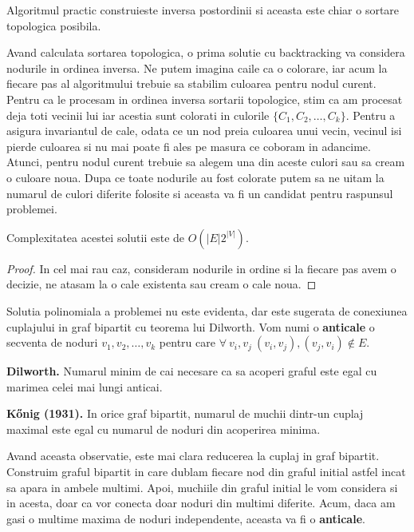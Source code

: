 Algoritmul practic construieste inversa postordinii si aceasta este chiar o sortare topologica posibila.

Avand calculata sortarea topologica, o prima solutie cu backtracking va considera nodurile in ordinea inversa.
Ne putem imagina caile ca o colorare, iar acum la fiecare pas al algoritmului trebuie sa stabilim culoarea pentru
nodul curent. Pentru ca le procesam in ordinea inversa sortarii topologice, stim ca am procesat deja toti vecinii lui
iar acestia sunt colorati in culorile $\{C_{1}, C_{2}, \ldots, C_{k}\}$. Pentru a asigura invariantul de cale, odata ce
un nod preia culoarea unui vecin, vecinul isi pierde culoarea si nu mai poate fi ales pe masura ce coboram in adancime.
Atunci, pentru nodul curent trebuie sa alegem una din aceste culori sau sa cream o culoare noua. Dupa ce toate nodurile
au fost colorate putem sa ne uitam la numarul de culori diferite folosite si aceasta va fi un candidat pentru raspunsul
problemei.

\begin{lem}
  Complexitatea acestei solutii este de $O(|E|2^{|V|})$.
\end{lem}

\begin{proof}
  In cel mai rau caz, consideram nodurile in ordine si la fiecare pas avem o decizie, ne atasam la o cale existenta sau cream o cale
  noua.
\end{proof}

\noindent Solutia polinomiala a problemei nu este evidenta, dar este sugerata de conexiunea cuplajului in graf bipartit cu teorema lui
Dilworth. Vom numi o \textbf{anticale} o secventa de noduri $v_{1}, v_{2}, \ldots, v_{k}$ pentru care
$\forall \ v_{i}, v_{j} \ (v_{i}, v_{j}), (v_{j}, v_{i}) \notin E$.

\begin{thm}
  \label{Dilworth}
  \textbf{Dilworth.} Numarul minim de cai necesare ca sa acoperi graful este egal cu marimea celei mai lungi anticai.
\end{thm}

\begin{thm}
  \label{Konig}
  \textbf{Kőnig (1931).} In orice graf bipartit, numarul de muchii dintr-un cuplaj maximal este egal cu numarul de noduri din acoperirea minima.
\end{thm}

Avand aceasta observatie, este mai clara reducerea la cuplaj in graf bipartit. Construim graful bipartit in care dublam fiecare nod din graful
initial astfel incat sa apara in ambele multimi. Apoi, muchiile din graful initial le vom considera si in acesta, doar ca vor conecta doar
noduri din multimi diferite. Acum, daca am gasi o multime maxima de noduri independente, aceasta va fi o \textbf{anticale}.


